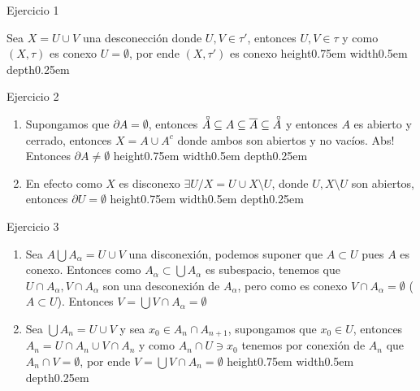 \documentclass[11pt]{article}
\newcommand{\interior}[1]{\accentset{\smash{\raisebox{-0.12ex}{$\scriptstyle\circ$}}}{#1}\rule{0pt}{2.3ex}}
\newenvironment{proof}[1][Demostraci\'on]{\begin{trivlist}
\item[\hskip \labelsep {\bfseries #1}]}{\end{trivlist}}
\newcommand{\qed}{\nobreak \ifvmode \relax \else
      \ifdim\lastskip<1.5em \hskip-\lastskip
      \hskip1.5em plus0em minus0.5em \fi \nobreak
      \vrule height0.75em width0.5em depth0.25em\fi}
\begin{document}
\begin{enumerate}

\item {Ejercicio 1}

\begin{proof}

Sea $X = U \cup V$ una desconecci\'on donde $U,V \in \tau'$, entonces $U,V \in \tau$ y como $(X,\tau)$ es conexo $U = \emptyset$, por ende $(X,\tau')$ es conexo \qed

\end{proof}

\item {Ejercicio 2}

\begin{proof}

\begin{enumerate}

\item Supongamos que $\partial A = \emptyset$, entonces $ \interior{A} \subseteq A \subseteq \overline{A} \subseteq \interior{A} $ y entonces $A$ es abierto y cerrado, entonces $X = A \cup A^{c}$ donde ambos son abiertos y no vac\'ios. Abs! Entonces $\partial A \neq \emptyset$ \qed

\item En efecto como $X$ es disconexo $\exists U / X = U \cup X \setminus U$, donde $U,X \setminus U$ son abiertos, entonces $\partial U = \emptyset$ \qed

\end{enumerate}

\end{proof}

\item {Ejercicio 3}

\begin{proof}

\begin{enumerate}

\item Sea $A \bigcup {A_{\alpha}} = U \cup V$ una disconexi\'on, podemos suponer que $A  \subset U$ pues $A$ es conexo. Entonces como $A_{\alpha} \subset \bigcup {A_{\alpha}}$ es subespacio, tenemos que $U \cap A_{\alpha},V \cap A_{\alpha}$ son una desconexi\'on de $A_{\alpha}$, pero como es conexo $V \cap A_{\alpha} = \emptyset$ ($A \subset U $). Entonces $V = \bigcup {V \cap A_{\alpha}} = \emptyset$

\item Sea $\bigcup {A_n} = U \cup V$ y sea $x_0 \in A_{n} \cap A_{n+1}$, supongamos que $x_0 \in U$, entonces $A_n = U \cap A_n \cup V \cap A_n$ y como $A_n \cap U \ni x_0$ tenemos por conexi\'on de $A_n$ que $A_n \cap V = \emptyset$, por ende $V = \bigcup{V \cap A_n} = \emptyset$ \qed


\end{enumerate}
\end{proof}
\end{enumerate}
\end{document}
